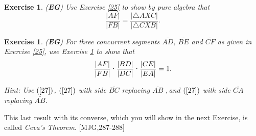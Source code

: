 \documentclass{article}%
\newtheorem{exercise}[theorem]{Exercise}
\begin{document}
\begin{exercise}
\label{26}(\textbf{EG}) Use Exercise \ref{25} to show by pure algebra that%
\begin{equation}
\frac{\left\vert AF\right\vert }{\left\vert FB\right\vert }=\frac{\left\vert
\triangle AXC\right\vert }{\left\vert \triangle CXB\right\vert }. \label{27}%
\end{equation}

\end{exercise}

\begin{exercise}
\label{28}(\textbf{EG}) For three concurrent segments $\overline{AD}$,
$\overline{BE}$ and $\overline{CF}$ as given in Exercise \ref{25}, use
Exercise \ref{26} to show that%
\[
\frac{\left\vert AF\right\vert }{\left\vert FB\right\vert }%
\text{\textperiodcentered}\frac{\left\vert BD\right\vert }{\left\vert
DC\right\vert }\text{\textperiodcentered}\frac{\left\vert CE\right\vert
}{\left\vert EA\right\vert }=1.
\]


Hint: Use $\left(  \ref{27}\right)  $, $\left(  \ref{27}\right)  $ with side
$\overline{BC}$ replacing $\overline{AB}$ $,$and $\left(  \ref{27}\right)  $
with side $\overline{CA}$ replacing $\overline{AB}$.
\end{exercise}

This last result with its converse, which you will show in the next Exercise,
is called \textit{Ceva's Theorem}. [MJG,287-288]
\end{document}
